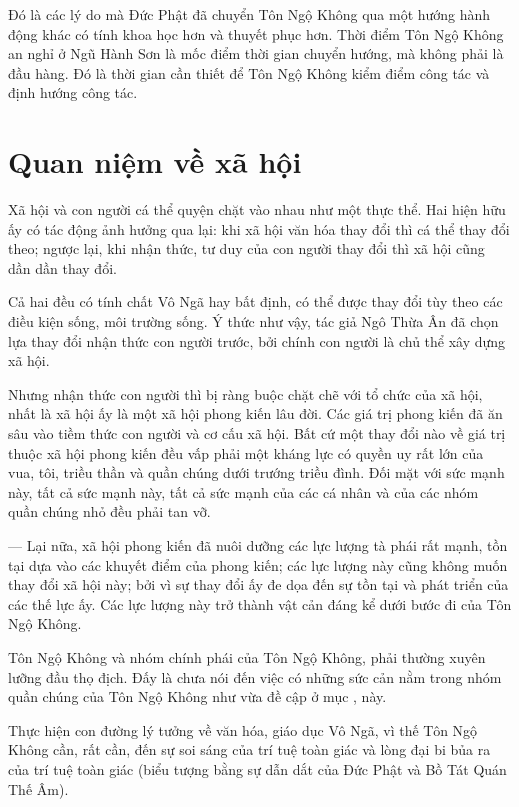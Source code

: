 Đó là các lý do mà Đức Phật đã chuyển Tôn Ngộ Không qua một hướng hành động khác có tính khoa học hơn và thuyết phục hơn. Thời điểm Tôn Ngộ Không an nghỉ ở Ngũ Hành Sơn là mốc điểm thời gian chuyển hướng, mà không phải là đầu hàng. Đó là thời gian cần thiết để Tôn Ngộ Không kiểm điểm công tác và định hướng công tác.


\section{Quan niệm về xã hội} %
\label{sec:8_xa_hoi}

Xã hội và con người cá thể quyện chặt vào nhau như một thực thể. Hai hiện hữu ấy có tác động ảnh hưởng qua lại: khi xã hội văn hóa thay đổi thì cá thể thay đổi theo; ngược lại, khi nhận thức, tư duy của con người thay đổi thì xã hội cũng dần dần thay đổi.

Cả hai đều có tính chất Vô Ngã hay bất định, có thể được thay đổi tùy theo các điều kiện sống, môi trường sống. Ý thức như vậy, tác giả Ngô Thừa Ân đã chọn lựa thay đổi nhận thức con người trước, bởi chính con người là chủ thể xây dựng xã hội.

Nhưng nhận thức con người thì bị ràng buộc chặt chẽ với tổ chức của xã hội, nhất là xã hội ấy là một xã hội phong kiến lâu đời. Các giá trị phong kiến đã ăn sâu vào tiềm thức con người và cơ cấu xã hội. Bất cứ một thay đổi nào về giá trị thuộc xã hội phong kiến đều vấp phải một kháng lực có quyền uy rất lớn của vua, tôi, triều thần và quần chúng dưới trướng triều đình. Đối mặt với sức mạnh này, tất cả sức mạnh này, tất cả sức mạnh của các cá nhân và của các nhóm quần chúng nhỏ đều phải tan vỡ.

— Lại nữa, xã hội phong kiến đã nuôi dưỡng các lực lượng tà phái rất mạnh, tồn tại dựa vào các khuyết điểm của phong kiến; các lực lượng này cũng không muốn thay đổi xã hội này; bởi vì sự thay đổi ấy đe dọa đến sự tồn tại và phát triển của các thế lực ấy. Các lực lượng này trở thành vật cản đáng kể dưới bước đi của Tôn Ngộ Không.

Tôn Ngộ Không và nhóm chính phái của Tôn Ngộ Không, phải thường xuyên lưỡng đầu thọ địch. Đấy là chưa nói đến việc có những sức cản nằm trong nhóm quần chúng của Tôn Ngộ Không như vừa đề cập ở mục ,  này.

Thực hiện con đường lý tưởng về văn hóa, giáo dục Vô Ngã, vì thế Tôn Ngộ Không cần, rất cần, đến sự soi sáng của trí tuệ toàn giác và lòng đại bi bủa ra của trí tuệ toàn giác (biểu tượng bằng sự dẫn dắt của Đức Phật và Bồ Tát Quán Thế Âm).

